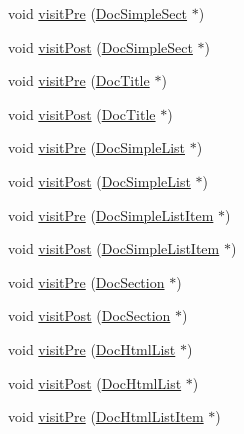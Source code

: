 \begin{DoxyCompactItemize}
\item 
void \hyperlink{class_perl_mod_doc_visitor_a61377bb003e74b040d5875f883211793}{visit\+Pre} (\hyperlink{class_doc_simple_sect}{Doc\+Simple\+Sect} $\ast$)
\item 
void \hyperlink{class_perl_mod_doc_visitor_aa2f264f3abcc2c272cb0d64f65dc7d1c}{visit\+Post} (\hyperlink{class_doc_simple_sect}{Doc\+Simple\+Sect} $\ast$)
\item 
void \hyperlink{class_perl_mod_doc_visitor_ab5ae966ee80b6e4fc33089c62bda123e}{visit\+Pre} (\hyperlink{class_doc_title}{Doc\+Title} $\ast$)
\item 
void \hyperlink{class_perl_mod_doc_visitor_a3a67bd115b6f20c51b380dc86730937a}{visit\+Post} (\hyperlink{class_doc_title}{Doc\+Title} $\ast$)
\item 
void \hyperlink{class_perl_mod_doc_visitor_a86de76f31d38a5eaaa536e0fdcbfce63}{visit\+Pre} (\hyperlink{class_doc_simple_list}{Doc\+Simple\+List} $\ast$)
\item 
void \hyperlink{class_perl_mod_doc_visitor_abf4490c7e1aa310aedbfffb80711e49b}{visit\+Post} (\hyperlink{class_doc_simple_list}{Doc\+Simple\+List} $\ast$)
\item 
void \hyperlink{class_perl_mod_doc_visitor_a690b22aca05c230964a13747f9fc729c}{visit\+Pre} (\hyperlink{class_doc_simple_list_item}{Doc\+Simple\+List\+Item} $\ast$)
\item 
void \hyperlink{class_perl_mod_doc_visitor_ae14c112a95898c08ab1d5026e02087e7}{visit\+Post} (\hyperlink{class_doc_simple_list_item}{Doc\+Simple\+List\+Item} $\ast$)
\item 
void \hyperlink{class_perl_mod_doc_visitor_abf66edea256117f346019ac50def68de}{visit\+Pre} (\hyperlink{class_doc_section}{Doc\+Section} $\ast$)
\item 
void \hyperlink{class_perl_mod_doc_visitor_a8785bd391cc71b449c8bd4009bdf1f35}{visit\+Post} (\hyperlink{class_doc_section}{Doc\+Section} $\ast$)
\item 
void \hyperlink{class_perl_mod_doc_visitor_a9fcbe24c80071ce858b792e1c0184d73}{visit\+Pre} (\hyperlink{class_doc_html_list}{Doc\+Html\+List} $\ast$)
\item 
void \hyperlink{class_perl_mod_doc_visitor_a2264ead646d34965ddf1e7069753d303}{visit\+Post} (\hyperlink{class_doc_html_list}{Doc\+Html\+List} $\ast$)
\item 
void \hyperlink{class_perl_mod_doc_visitor_a1fb81f56b12a31c04e2d8d64d0ee343a}{visit\+Pre} (\hyperlink{class_doc_html_list_item}{Doc\+Html\+List\+Item} $\ast$)
\item 

\end{DoxyCompactItemize}
